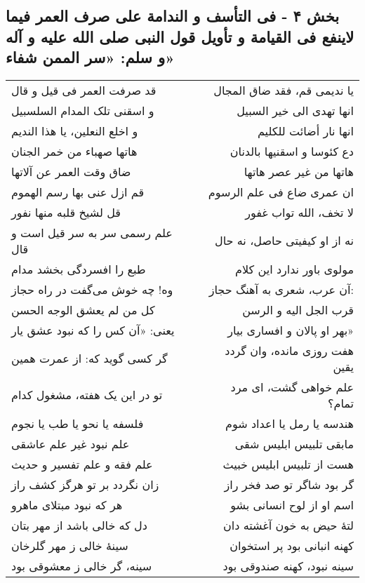 \begin{center}
\section*{بخش ۴ - فی التأسف و الندامة علی صرف العمر فیما  لاینفع فی القیامة و تأویل قول النبی صلی الله علیه و آله و سلم: «سر الممن شفاء»}
\label{sec:004}
\begin{longtable}{l p{0.5cm} r}
قد صرفت العمر فی قیل و قال
&&
یا ندیمی قم، فقد ضاق المجال
\\
و اسقنی تلک المدام السلسبیل
&&
انها تهدی الی خیر السبیل
\\
و اخلع النعلین، یا هذا الندیم
&&
انها نار أضائت للکلیم
\\
هاتها صهباء من خمر الجنان
&&
دع کئوسا و اسقنیها بالدنان
\\
ضاق وقت العمر عن آلاتها
&&
هاتها من غیر عصر هاتها
\\
قم ازل عنی بها رسم الهموم
&&
ان عمری ضاع فی علم الرسوم
\\
قل لشیخ قلبه منها نفور
&&
لا تخف، الله تواب غفور
\\
علم رسمی سر به سر قیل است و قال
&&
نه از او کیفیتی حاصل، نه حال
\\
طبع را افسردگی بخشد مدام
&&
مولوی باور ندارد این کلام
\\
وه! چه خوش می‌گفت در راه حجاز
&&
آن عرب، شعری به آهنگ حجاز:
\\
کل من لم یعشق الوجه الحسن
&&
قرب الجل الیه و الرسن
\\
یعنی: «آن کس را که نبود عشق یار
&&
بهر او پالان و افساری بیار»
\\
گر کسی گوید که: از عمرت همین
&&
هفت روزی مانده، وان گردد یقین
\\
تو در این یک هفته، مشغول کدام
&&
علم خواهی گشت، ای مرد تمام؟
\\
فلسفه یا نحو یا طب یا نجوم
&&
هندسه یا رمل یا اعداد شوم
\\
علم نبود غیر علم عاشقی
&&
مابقی تلبیس ابلیس شقی
\\
علم فقه و علم تفسیر و حدیث
&&
هست از تلبیس ابلیس خبیث
\\
زان نگردد بر تو هرگز کشف راز
&&
گر بود شاگر تو صد فخر راز
\\
هر که نبود مبتلای ماهرو
&&
اسم او از لوح انسانی بشو
\\
دل که خالی باشد از مهر بتان
&&
لتهٔ حیض به خون آغشته دان
\\
سینهٔ خالی ز مهر گلرخان
&&
کهنه انبانی بود پر استخوان
\\
سینه، گر خالی ز معشوقی بود
&&
سینه نبود، کهنه صندوقی بود

\end{longtable}
\end{center}
